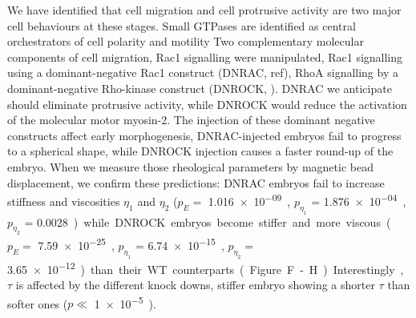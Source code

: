 We have identified that cell migration and cell protrusive activity are two major cell behaviours at these stages.
Small GTPases are identified as central orchestrators of cell polarity and motility %
Two complementary molecular components of cell migration, Rac1 signalling were manipulated,
Rac1 signalling using a dominant-negative Rac1 construct (DNRAC, ref), RhoA signalling by a dominant-negative Rho-kinase construct (DNROCK, %
).
DNRAC we anticipate should eliminate protrusive activity, while DNROCK would reduce the activation of the molecular motor myosin-2.
The injection of these dominant negative constructs affect early morphogenesis, DNRAC-injected embryos fail to progress to a spherical shape, while DNROCK injection causes a faster round-up of the embryo.
When we measure those rheological parameters by magnetic bead displacement, we confirm these predictions: DNRAC embryos fail to increase stiffness and viscosities $\eta_1$ and $\eta_2$ ($p_E = $ \SI{1.016e-09}, $p_{\eta_1}$ = \SI{1.876e-04}, $p_{\eta_2}$ = \SI{0.0028}) while DNROCK embryos become stiffer and more viscous ($p_E =$ \SI{7.59e-25}, $p_{\eta_1}$ = \SI{6.74e-15}, $p_{\eta_2} =$ \SI{3.65e-12}) than their WT counterparts (Figure .F-H).
Interestingly, $\tau$ is affected by the different knock downs, stiffer embryo showing a shorter $\tau$ than softer ones ($p \ll $ \SI{1e-5}).

